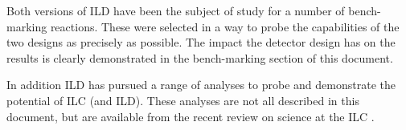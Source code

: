 Both versions of ILD have been the subject of study for a number of bench-marking reactions. These were selected in a way to probe the capabilities of the two designs as precisely as possible. The impact the detector design has on the results is clearly demonstrated in the bench-marking section of this document. 

In addition ILD has pursued a range of analyses to probe and demonstrate the potential of ILC (and ILD). These analyses are not all described in this document, but are available from the recent review on science at the ILC \cite{ild:bib:ref-keisuke}.






